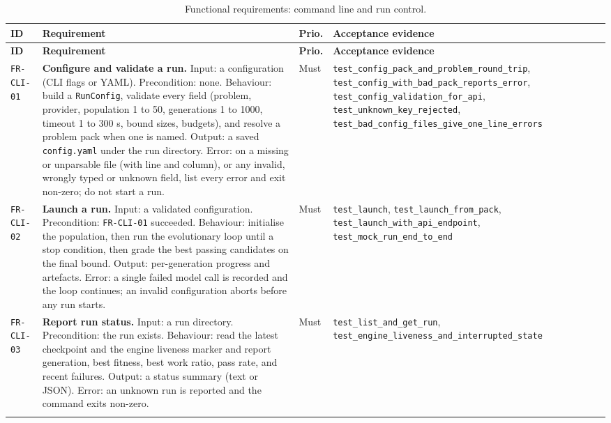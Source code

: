 \begin{longtable}{@{}>{\raggedright\arraybackslash}p{}>{\raggedright\arraybackslash}p{}p{}>{\raggedright\arraybackslash}p{}@{}}
\caption{Functional requirements: command line and run control.}\label{tab:fr-cli}\\
\toprule
\textbf{ID} & \textbf{Requirement} & \textbf{Prio.} & \textbf{Acceptance evidence} \\
\midrule
\endfirsthead
\toprule
\textbf{ID} & \textbf{Requirement} & \textbf{Prio.} & \textbf{Acceptance evidence} \\
\midrule
\endhead
\bottomrule
\endfoot

\texttt{FR-CLI-01} & \textbf{Configure and validate a run.} Input: a
configuration (CLI flags or YAML). Precondition: none. Behaviour: build a
\texttt{RunConfig}, validate every field (problem, provider, population 1 to
50, generations 1 to 1000, timeout 1 to 300 s, bound sizes, budgets), and
resolve a problem pack when one is named. Output: a saved
\texttt{config.yaml} under the run directory. Error: on a missing or unparsable
file (with line and column), or any invalid, wrongly typed or unknown field,
list every error and exit non-zero; do not start a run. & Must &
\texttt{test\_config\_pack\_and\_problem\_round\_trip},
\texttt{test\_config\_with\_bad\_pack\_reports\_error},
\texttt{test\_config\_validation\_for\_api}, \texttt{test\_unknown\_key\_rejected},
\texttt{test\_bad\_config\_files\_give\_one\_line\_errors} \\
\addlinespace[2pt]

\texttt{FR-CLI-02} & \textbf{Launch a run.} Input: a validated configuration.
Precondition: \texttt{FR-CLI-01} succeeded. Behaviour: initialise the
population, then run the evolutionary loop until a stop condition, then grade
the best passing candidates on the final bound. Output: per-generation progress
and artefacts. Error: a single failed model call is recorded and the loop
continues; an invalid configuration aborts before any run starts. & Must &
\texttt{test\_launch}, \texttt{test\_launch\_from\_pack},
\texttt{test\_launch\_with\_api\_endpoint}, \texttt{test\_mock\_run\_end\_to\_end} \\
\addlinespace[2pt]

\texttt{FR-CLI-03} & \textbf{Report run status.} Input: a run directory.
Precondition: the run exists. Behaviour: read the latest checkpoint and the
engine liveness marker and report generation, best fitness, best work ratio,
pass rate, and recent failures. Output: a status summary (text or JSON). Error:
an unknown run is reported and the command exits non-zero. & Must &
\texttt{test\_list\_and\_get\_run},
\texttt{test\_engine\_liveness\_and\_interrupted\_state} \\
\addlinespace[2pt]


\end{longtable}
